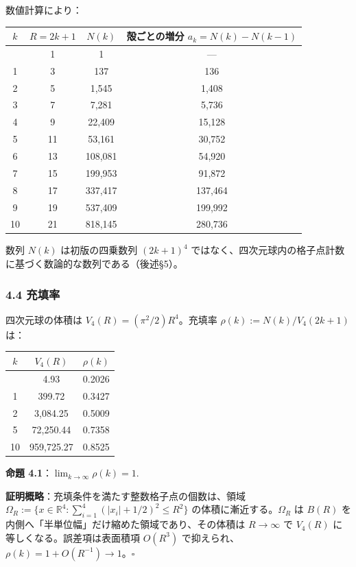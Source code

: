 \documentclass[a4paper,11pt]{ltjsarticle}
\theoremstyle{definition}
\begin{document}
数値計算により：

{\def\LTcaptype{none} %
\begin{longtable}[]{@{}cccc@{}}
\toprule\noalign{}
\(k\) & \(R = 2k+1\) & \(N(k)\) & 殻ごとの増分
\(a_k = N(k) - N(k-1)\) \\
\midrule\noalign{}
\endhead
\bottomrule\noalign{}
\endlastfoot
0 & 1 & 1 & --- \\
1 & 3 & 137 & 136 \\
2 & 5 & 1,545 & 1,408 \\
3 & 7 & 7,281 & 5,736 \\
4 & 9 & 22,409 & 15,128 \\
5 & 11 & 53,161 & 30,752 \\
6 & 13 & 108,081 & 54,920 \\
7 & 15 & 199,953 & 91,872 \\
8 & 17 & 337,417 & 137,464 \\
9 & 19 & 537,409 & 199,992 \\
10 & 21 & 818,145 & 280,736 \\
\end{longtable}
}

数列 \(N(k)\) は初版の四乗数列 \((2k+1)^4\)
ではなく、四次元球内の格子点計数に基づく数論的な数列である（後述§5）。

\subsubsection{4.4 充填率}\label{ux5145ux586bux7387}

四次元球の体積は \(V_4(R) = (\pi^2/2) R^4\)。充填率
\(\rho(k) := N(k) / V_4(2k+1)\) は：

{\def\LTcaptype{none} %
\begin{longtable}[]{@{}ccc@{}}
\toprule\noalign{}
\(k\) & \(V_4(R)\) & \(\rho(k)\) \\
\midrule\noalign{}
\endhead
\bottomrule\noalign{}
\endlastfoot
0 & 4.93 & 0.2026 \\
1 & 399.72 & 0.3427 \\
2 & 3,084.25 & 0.5009 \\
5 & 72,250.44 & 0.7358 \\
10 & 959,725.27 & 0.8525 \\
\end{longtable}
}

\textbf{命題 4.1}：\(\displaystyle \lim_{k \to \infty} \rho(k) = 1\).

\textbf{証明概略}：充填条件を満たす整数格子点の個数は、領域
\(\Omega_R := \{x \in \mathbb{R}^4 : \sum_{i=1}^{4} (|x_i|+1/2)^2 \le R^2\}\)
の体積に漸近する。\(\Omega_R\) は \(B(R)\)
を内側へ「半単位幅」だけ縮めた領域であり、その体積は \(R \to \infty\) で
\(V_4(R)\) に等しくなる。誤差項は表面積項 \(O(R^3)\)
で抑えられ、\(\rho(k) = 1 + O(R^{-1}) \to 1\)。\(\square\)
\end{document}
